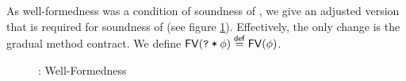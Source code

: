 As well-formedness was a condition of soundness of \svlidf, we give an adjusted version that is required for soundness of \gvlidf (see figure \ref{fig:gidf-wf}).
Effectively, the only change is the gradual method contract.
We define $\textup{\textmd{\textsf{FV}}}(\textup{\texttt{\textup{\texttt{?}}\:*\:\ensuremath{\phi}}}) \overset{\textup{\textmd{\textsf{def}}}}{=} \textup{\textmd{\textsf{FV}}}(\phi)$.

\begin{figure}[h]
    
    \caption{\gvlidf: Well-Formedness}
    \label{fig:gidf-wf}
\end{figure}

